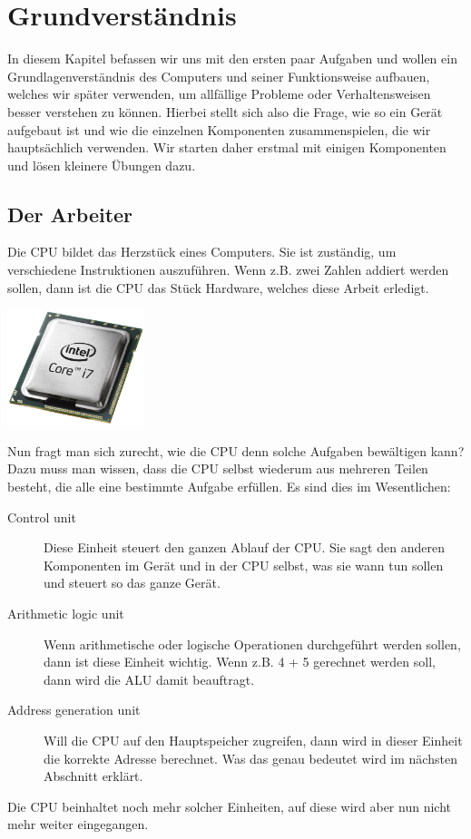 \newpage
\chapter{Grundverständnis}
In diesem Kapitel befassen wir uns mit den ersten paar Aufgaben und wollen ein Grundlagenverständnis des Computers und
seiner Funktionsweise aufbauen, welches wir später verwenden, um allfällige Probleme oder Verhaltensweisen besser
verstehen zu können.
Hierbei stellt sich also die Frage, wie so ein Gerät aufgebaut ist und wie die einzelnen Komponenten zusammenspielen, die
wir hauptsächlich verwenden. Wir starten daher erstmal mit einigen Komponenten und lösen kleinere Übungen dazu.

\section{Der Arbeiter}
Die \gls{CPU} bildet das Herzstück eines Computers. Sie ist zuständig, um verschiedene Instruktionen auszuführen. Wenn
z.B. zwei Zahlen addiert werden sollen, dann ist die CPU das Stück Hardware, welches diese Arbeit erledigt.\par
\begin{minipage}{\linewidth}
    \centering
    \includegraphics[width=0.3\textwidth]{../common/chapter_02/resources/01_cpu_intel.png}
\end{minipage}
Nun fragt man sich zurecht, wie die CPU denn solche Aufgaben bewältigen kann? Dazu muss man wissen, dass die CPU
selbst wiederum aus mehreren Teilen besteht, die alle eine bestimmte Aufgabe erfüllen. Es sind dies im Wesentlichen:
\begin{description}
    \item[Control unit] Diese Einheit steuert den ganzen Ablauf der CPU. Sie sagt den anderen Komponenten im Gerät und
    in der CPU selbst, was sie wann tun sollen und steuert so das ganze Gerät.\cite{wikipedia:cu}
    \item[Arithmetic logic unit] Wenn arithmetische oder logische Operationen durchgeführt werden sollen, dann ist diese
    Einheit wichtig. Wenn z.B. 4 + 5 gerechnet werden soll, dann wird die ALU damit beauftragt.\cite{wikipedia:alu}
    \item[Address generation unit] Will die CPU auf den Hauptspeicher zugreifen, dann wird in dieser Einheit die korrekte
    Adresse berechnet. Was das genau bedeutet wird im nächsten Abschnitt erklärt.\cite{wikipedia:agu}
\end{description}
Die CPU beinhaltet noch mehr solcher Einheiten, auf diese wird aber nun nicht mehr weiter eingegangen.
